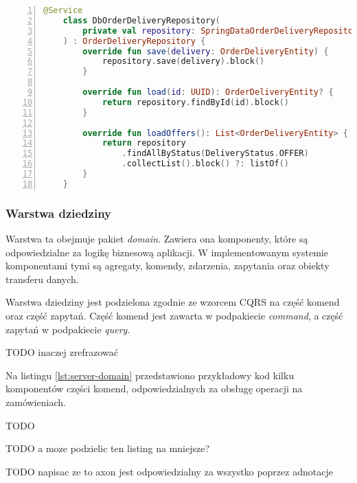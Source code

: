 \begin{lstlisting}[caption={Przykładowy kod implementacji repozytorium bazodanowego},label={lst:server-out-adapter},captionpos=b,language=Kotlin,numbers=left]
    @Service
    class DbOrderDeliveryRepository(
        private val repository: SpringDataOrderDeliveryRepository
    ) : OrderDeliveryRepository {
        override fun save(delivery: OrderDeliveryEntity) {
            repository.save(delivery).block()
        }
    
        override fun load(id: UUID): OrderDeliveryEntity? {
            return repository.findById(id).block()
        }
    
        override fun loadOffers(): List<OrderDeliveryEntity> {
            return repository
                .findAllByStatus(DeliveryStatus.OFFER)
                .collectList().block() ?: listOf()
        }
    }
\end{lstlisting}

\subsubsection{Warstwa dziedziny} 

Warstwa ta obejmuje pakiet \textit{domain}. Zawiera ona komponenty, które są odpowiedzialne za logikę biznesową aplikacji. W implementowanym systemie komponentami tymi są agregaty, komendy, zdarzenia, zapytania oraz obiekty transferu danych.

Warstwa dziedziny jest podzielona zgodnie ze wzorcem CQRS na część komend oraz część zapytań. Część komend jest zawarta w podpakiecie \textit{command}, a część zapytań w podpakiecie \textit{query}.

TODO inaczej zrefrazować

Na listingu \ref{lst:server-domain} przedstawiono przykładowy kod kilku komponentów części komend, odpowiedzialnych za obsługę operacji na zamówieniach.

TODO

TODO a moze podzielic ten listing na mniejsze?

TODO napisac ze to axon jest odpowiedzialny za wszystko poprzez adnotacje

